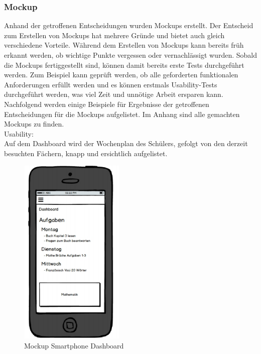 \subsubsection*{Mockup}
Anhand der getroffenen Entscheidungen wurden Mockups erstellt. Der Entscheid zum Erstellen von Mockups hat mehrere Gründe und bietet auch gleich verschiedene Vorteile. Während dem Erstellen von Mockups kann bereits früh erkannt werden, ob wichtige Punkte vergessen oder vernachlässigt wurden. Sobald die Mockups fertiggestellt sind, können damit bereits erste Tests durchgeführt werden. Zum Beispiel kann geprüft werden, ob alle geforderten funktionalen Anforderungen erfüllt werden und es können erstmals Usability-Tests durchgeführt werden, was viel Zeit und unnötige Arbeit ersparen kann. \\

Nachfolgend werden einige Beispiele für Ergebnisse der getroffenen Entscheidungen für die Mockups aufgelistet. Im Anhang sind alle gemachten Mockups zu finden. \\ %

Usability: \\
Auf dem Dashboard wird der Wochenplan des Schülers, gefolgt von den derzeit besuchten Fächern, knapp und ersichtlich aufgelistet. \\
\begin{minipage}{\textwidth}
	\begin{figure}[H]
	\centering
		\includegraphics[width=5cm, keepaspectratio]{images/Mockups/Dashboard_Smartphone.png}
		\caption{Mockup Smartphone Dashboard}
	\end{figure}
\end{minipage}


